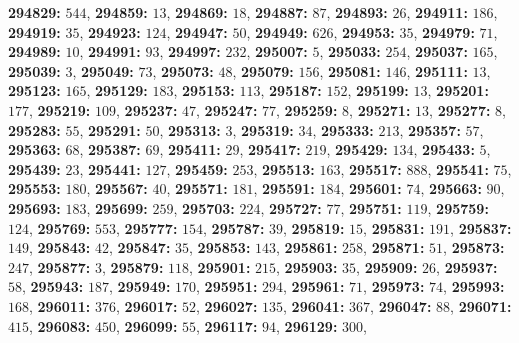 \textsf{\bfseries 294829:} $544$, \textsf{\bfseries 294859:} $13$, \textsf{\bfseries 294869:} $18$, \textsf{\bfseries 294887:} $87$, \textsf{\bfseries 294893:} $26$, \textsf{\bfseries 294911:} $186$, \textsf{\bfseries 294919:} $35$, \textsf{\bfseries 294923:} $124$, \textsf{\bfseries 294947:} $50$, \textsf{\bfseries 294949:} $626$, \textsf{\bfseries 294953:} $35$, \textsf{\bfseries 294979:} $71$, \textsf{\bfseries 294989:} $10$, \textsf{\bfseries 294991:} $93$, \textsf{\bfseries 294997:} $232$, \textsf{\bfseries 295007:} $5$, \textsf{\bfseries 295033:} $254$, \textsf{\bfseries 295037:} $165$, \textsf{\bfseries 295039:} $3$, \textsf{\bfseries 295049:} $73$, \textsf{\bfseries 295073:} $48$, \textsf{\bfseries 295079:} $156$, \textsf{\bfseries 295081:} $146$, \textsf{\bfseries 295111:} $13$, \textsf{\bfseries 295123:} $165$, \textsf{\bfseries 295129:} $183$, \textsf{\bfseries 295153:} $113$, \textsf{\bfseries 295187:} $152$, \textsf{\bfseries 295199:} $13$, \textsf{\bfseries 295201:} $177$, \textsf{\bfseries 295219:} $109$, \textsf{\bfseries 295237:} $47$, \textsf{\bfseries 295247:} $77$, \textsf{\bfseries 295259:} $8$, \textsf{\bfseries 295271:} $13$, \textsf{\bfseries 295277:} $8$, \textsf{\bfseries 295283:} $55$, \textsf{\bfseries 295291:} $50$, \textsf{\bfseries 295313:} $3$, \textsf{\bfseries 295319:} $34$, \textsf{\bfseries 295333:} $213$, \textsf{\bfseries 295357:} $57$, \textsf{\bfseries 295363:} $68$, \textsf{\bfseries 295387:} $69$, \textsf{\bfseries 295411:} $29$, \textsf{\bfseries 295417:} $219$, \textsf{\bfseries 295429:} $134$, \textsf{\bfseries 295433:} $5$, \textsf{\bfseries 295439:} $23$, \textsf{\bfseries 295441:} $127$, \textsf{\bfseries 295459:} $253$, \textsf{\bfseries 295513:} $163$, \textsf{\bfseries 295517:} $888$, \textsf{\bfseries 295541:} $75$, \textsf{\bfseries 295553:} $180$, \textsf{\bfseries 295567:} $40$, \textsf{\bfseries 295571:} $181$, \textsf{\bfseries 295591:} $184$, \textsf{\bfseries 295601:} $74$, \textsf{\bfseries 295663:} $90$, \textsf{\bfseries 295693:} $183$, \textsf{\bfseries 295699:} $259$, \textsf{\bfseries 295703:} $224$, \textsf{\bfseries 295727:} $77$, \textsf{\bfseries 295751:} $119$, \textsf{\bfseries 295759:} $124$, \textsf{\bfseries 295769:} $553$, \textsf{\bfseries 295777:} $154$, \textsf{\bfseries 295787:} $39$, \textsf{\bfseries 295819:} $15$, \textsf{\bfseries 295831:} $191$, \textsf{\bfseries 295837:} $149$, \textsf{\bfseries 295843:} $42$, \textsf{\bfseries 295847:} $35$, \textsf{\bfseries 295853:} $143$, \textsf{\bfseries 295861:} $258$, \textsf{\bfseries 295871:} $51$, \textsf{\bfseries 295873:} $247$, \textsf{\bfseries 295877:} $3$, \textsf{\bfseries 295879:} $118$, \textsf{\bfseries 295901:} $215$, \textsf{\bfseries 295903:} $35$, \textsf{\bfseries 295909:} $26$, \textsf{\bfseries 295937:} $58$, \textsf{\bfseries 295943:} $187$, \textsf{\bfseries 295949:} $170$, \textsf{\bfseries 295951:} $294$, \textsf{\bfseries 295961:} $71$, \textsf{\bfseries 295973:} $74$, \textsf{\bfseries 295993:} $168$, \textsf{\bfseries 296011:} $376$, \textsf{\bfseries 296017:} $52$, \textsf{\bfseries 296027:} $135$, \textsf{\bfseries 296041:} $367$, \textsf{\bfseries 296047:} $88$, \textsf{\bfseries 296071:} $415$, \textsf{\bfseries 296083:} $450$, \textsf{\bfseries 296099:} $55$, \textsf{\bfseries 296117:} $94$, \textsf{\bfseries 296129:} $300$, 
